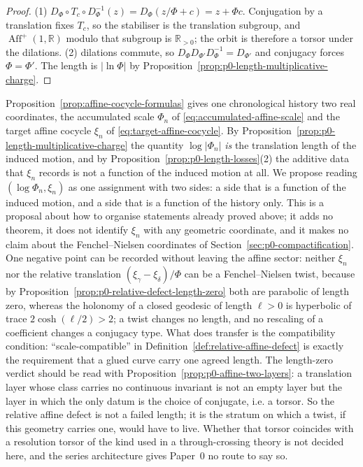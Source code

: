 \begin{proof}
(1) $D_\Phi\circ T_c\circ D_\Phi^{-1}(z)=D_\Phi(z/\Phi+c)=z+\Phi c$.  Conjugation by
a translation fixes $T_c$, so the stabiliser is the translation subgroup, and
$\operatorname{Aff}^{+}(1,\mathbb R)$ modulo that subgroup is
$\mathbb R_{>0}$; the orbit is therefore a torsor under the dilations.
(2) dilations commute, so $D_\Phi D_{\Phi'}D_\Phi^{-1}=D_{\Phi'}$ and conjugacy
forces $\Phi=\Phi'$.  The length is
$\lvert\ln\Phi\rvert$ by Proposition~\ref{prop:p0-length-multiplicative-charge}.
\end{proof}

\begin{remark}
\label{rem:p0-length-two-coordinates}
Proposition~\ref{prop:affine-cocycle-formulas} gives one chronological history two
real coordinates, the accumulated scale $\Phi_n$ of
\eqref{eq:accumulated-affine-scale} and the target affine cocycle $\xi_n$ of
\eqref{eq:target-affine-cocycle}.  By
Proposition~\ref{prop:p0-length-multiplicative-charge} the quantity
$\log\lvert\Phi_n\rvert$ \emph{is} the translation length of the induced motion, and
by Proposition~\ref{prop:p0-length-losses}(2) the additive data that $\xi_n$ records
is not a function of the induced motion at all.  We propose reading
$(\log\Phi_n,\xi_n)$ as one assignment with two sides: a side that is a function of
the induced motion, and a side that is a function of the history only.  This is a
proposal about how to organise statements already proved above; it adds no theorem,
it does not identify $\xi_n$ with any geometric coordinate, and it makes no claim
about the Fenchel--Nielsen coordinates of
Section~\ref{sec:p0-compactification}.  One negative point can be recorded without
leaving the affine sector: neither $\xi_n$ nor the relative translation
$(\xi_\gamma-\xi_\delta)/\Phi$ can be a Fenchel--Nielsen twist, because by
Proposition~\ref{prop:p0-relative-defect-length-zero} both are parabolic of length
zero, whereas the holonomy of a closed geodesic of length $\ell>0$ is hyperbolic of
trace $2\cosh(\ell/2)>2$; a twist changes no length, and no rescaling of a
coefficient changes a conjugacy type.  What does transfer is the compatibility
condition: ``scale-compatible'' in
Definition~\ref{def:relative-affine-defect} is exactly the requirement that a glued
curve carry one agreed length.  The length-zero verdict should be read with
Proposition~\ref{prop:p0-affine-two-layers}: a translation layer whose class carries
no continuous invariant is not an empty layer but the layer in which the only datum
is the choice of conjugate, i.e. a torsor.  So the relative affine defect is not a
failed length; it is the stratum on which a twist, if this geometry carries one,
would have to live.  Whether that torsor coincides with a resolution torsor of the kind used in a
through-crossing theory is not decided here, and the series architecture gives
Paper~0 no route to say so.
\end{remark}

